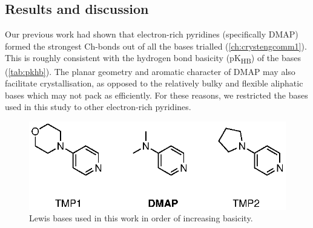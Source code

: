 \begin{refsection}
\section{Results and discussion}

  
Our previous work had shown that electron-rich pyridines (specifically DMAP) formed the strongest Ch-bonds out of all the bases trialled (\cref{ch:crystengcomm1}).
This is roughly consistent with the hydrogen bond basicity (pK\textsubscript{HB}) of the bases (\cref{tab:pkhb}).
The planar geometry and aromatic character of DMAP may also facilitate crystallisation, as opposed to the relatively bulky and flexible aliphatic bases which may not pack as efficiently.
For these reasons, we restricted the bases used in this study to other electron-rich pyridines.

\begin{figure}
  \centering
  \includegraphics[scale=0.74]{Figures/bases.eps}
  \caption[Lewis bases used in this work.]{Lewis bases used in this work in order of increasing basicity.}\label{fig:bases}
\end{figure}


\end{refsection}
